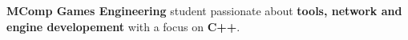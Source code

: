 \noindent
\begin{center}
    \textbf{MComp Games Engineering} student passionate about \textbf{tools, network and engine developement} with a focus on \textbf{C++}.
\end{center}
